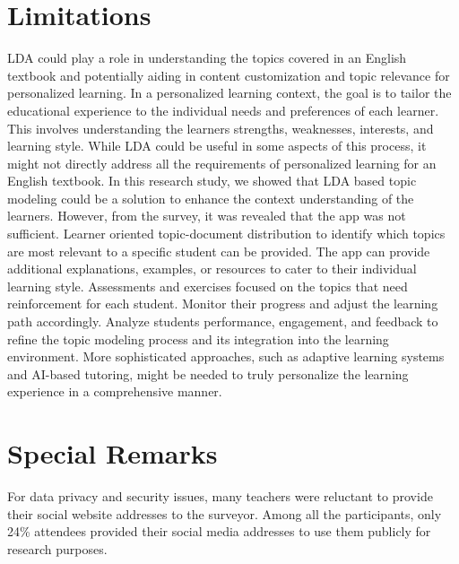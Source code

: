 \documentclass[sn-mathphys,Numbered]{sn-jnl}%
\theoremstyle{thmstyleone}%
\theoremstyle{thmstyletwo}%
\theoremstyle{thmstylethree}%
\begin{document}
\section{Limitations}\label{limitat}

LDA could play a role in understanding the topics covered in an English textbook and potentially aiding in content customization and topic relevance for personalized learning. In a personalized learning context, the goal is to tailor the educational experience to the individual needs and preferences of each learner. This involves understanding the learner\textquotesingle s strengths, weaknesses, interests, and learning style. While LDA could be useful in some aspects of this process, it might not directly address all the requirements of personalized learning for an English textbook. In this research study, we showed that LDA based topic modeling could be a solution to enhance the context understanding of the learners. However, from the survey, it was revealed that the app was not sufficient. Learner oriented topic-document distribution to identify which topics are most relevant to a specific student can be provided. The app can provide additional explanations, examples, or resources to cater to their individual learning style. Assessments and exercises focused on the topics that need reinforcement for each student. Monitor their progress and adjust the learning path accordingly. Analyze students\textquotesingle{} performance, engagement, and feedback to refine the topic modeling process and its integration into the learning environment. More sophisticated approaches, such as adaptive learning systems and AI-based tutoring, might be needed to truly personalize the learning experience in a comprehensive manner.

\section{Special Remarks}

For data privacy and security issues, many teachers were reluctant to provide their social website addresses to the surveyor. Among all the participants, only 24\% attendees provided their social media addresses to use them publicly for research purposes.
\end{document}
